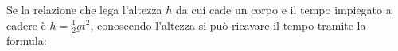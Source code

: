 Se la relazione che lega l'altezza $h$ da cui cade un corpo
e il tempo impiegato a cadere è 
$\displaystyle h = \frac{1}{2} g t^2$, conoscendo
l'altezza si può ricavare il tempo tramite la formula: